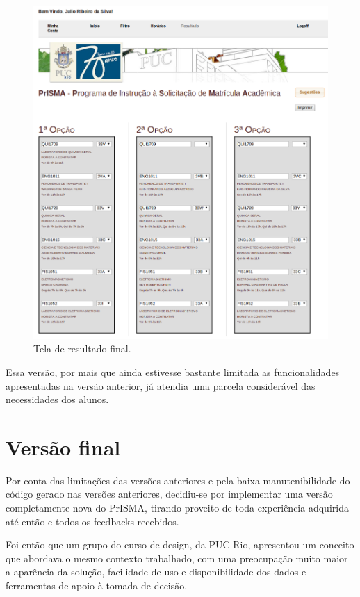\documentclass[graduacao,brazil]{ThesisPUC}
\begin{document}
\begin{figure}[H]
    \centering
    \includegraphics[width=\linewidth]{img/v2_final.png}
    \caption{Tela de resultado final.}
\end{figure}

Essa versão, por mais que ainda estivesse bastante limitada as funcionalidades apresentadas na versão anterior, já atendia uma parcela considerável das necessidades dos alunos.  


\section{Versão final}

Por conta das limitações das versões anteriores e pela baixa manutenibilidade do código gerado nas versões anteriores, decidiu-se por implementar uma versão completamente nova do PrISMA, tirando proveito de toda experiência adquirida até então e todos os feedbacks recebidos.

Foi então que um grupo do curso de design, da PUC-Rio, apresentou um conceito que abordava o mesmo contexto trabalhado, com uma preocupação muito maior a aparência da solução, facilidade de uso e disponibilidade dos dados e ferramentas de apoio à tomada de decisão.
\end{document}
